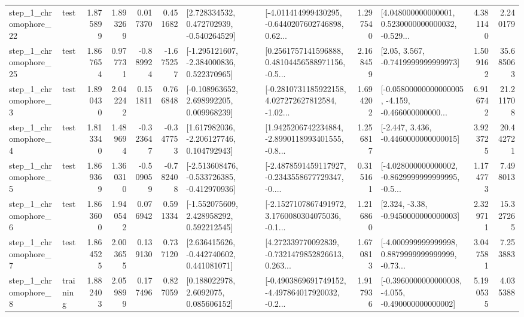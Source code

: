 \begin{tabular}{llrrrrllrlrr}
    step\_1\_chromophore\_22 &      test &      1.875899 &    1.893269 &      0.017370 &  0.451682 &    [2.728334532, 0.472702939, -0.540264529] &  [-4.011414999430295, -0.6440207602746898, 0.62... &       1.297540 &  [4.048000000000001, 0.5230000000000032, -0.529... &            4.381140 &          2.240179 \\
    step\_1\_chromophore\_25 &      test &      1.867654 &    0.977731 &     -0.889924 & -1.675257 &   [-1.295121607, -2.384000836, 0.522370965] &  [0.2561757141596888, 0.48104456588971156, -0.5... &       2.168459 &                 [2.05, 3.567, -0.7419999999999973] &            1.509162 &         35.685063 \\
     step\_1\_chromophore\_3 &      test &      1.890430 &    2.042242 &      0.151811 &  0.766848 &    [-0.108963652, 2.698992205, 0.009968239] &  [-0.2810731185922158, 4.027272627812584, -1.02... &       1.694202 &  [-0.05800000000000005, -4.159, -0.466000000000... &            6.916742 &         21.211708 \\
     step\_1\_chromophore\_4 &      test &      1.813340 &    1.489694 &     -0.323647 & -0.347753 &    [1.617982036, -2.206127746, 0.104792943] &  [1.9425206742234884, -2.8990118993401555, -0.8... &       1.256817 &               [-2.447, 3.436, -0.4460000000000015] &            3.923725 &         20.442721 \\
     step\_1\_chromophore\_5 &      test &      1.869369 &    1.360310 &     -0.509059 & -0.782408 &  [-2.513608476, -0.533726385, -0.412970936] &  [-2.4878591459117927, -0.2343558677729347, -0.... &       0.315161 &  [-4.028000000000002, -0.8629999999999995, -0.5... &            1.174773 &          7.498013 \\
     step\_1\_chromophore\_6 &      test &      1.863600 &    1.940542 &      0.076942 &  0.591334 &    [-1.552075609, 2.428958292, 0.592212545] &  [-2.1527107867491972, 3.1760080304075036, -0.1... &       1.216860 &                [2.324, -3.38, -0.9450000000000003] &            2.329711 &         15.327265 \\
     step\_1\_chromophore\_7 &      test &      1.864525 &    2.003655 &      0.139130 &  0.737120 &    [2.636415626, -0.442740602, 0.441081071] &  [4.272339770092839, -0.7321479852826613, 0.263... &       1.670813 &  [-4.000999999999998, 0.8879999999999999, -0.73... &            3.047581 &          7.253883 \\
     step\_1\_chromophore\_8 &  training &      1.882403 &    2.059899 &      0.177496 &  0.827059 &       [0.188022978, 2.6092075, 0.085606152] &  [-0.4903869691749152, -4.497864017920032, -0.2... &       1.917936 &  [-0.3960000000000008, -4.055, -0.490000000000002] &            5.190535 &          4.035388 \\

\end{tabular}
